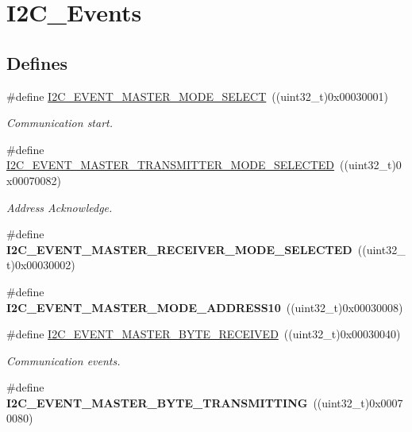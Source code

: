 \hypertarget{group__I2C__Events}{
\section{I2C\_\-Events}
\label{group__I2C__Events}
}
\subsection*{Defines}
\begin{DoxyCompactItemize}
\item 
\#define \hyperlink{group__I2C__Events_gaeef8c22ac035122b06e31b360ac7aeb3}{I2C\_\-EVENT\_\-MASTER\_\-MODE\_\-SELECT}~((uint32\_\-t)0x00030001)
\begin{DoxyCompactList}\small\item\em Communication start. \item\end{DoxyCompactList}\item 
\#define \hyperlink{group__I2C__Events_ga2361a6e60b7dc86fb682dd06fbd3edb7}{I2C\_\-EVENT\_\-MASTER\_\-TRANSMITTER\_\-MODE\_\-SELECTED}~((uint32\_\-t)0x00070082)
\begin{DoxyCompactList}\small\item\em Address Acknowledge. \item\end{DoxyCompactList}\item 
\hypertarget{group__I2C__Events_gabfde82864432ddb87b6462234d542e60}{
\#define {\bfseries I2C\_\-EVENT\_\-MASTER\_\-RECEIVER\_\-MODE\_\-SELECTED}~((uint32\_\-t)0x00030002)}
\label{group__I2C__Events_gabfde82864432ddb87b6462234d542e60}

\item 
\hypertarget{group__I2C__Events_gad04882597bbf542c6fee7a9c837fbc8c}{
\#define {\bfseries I2C\_\-EVENT\_\-MASTER\_\-MODE\_\-ADDRESS10}~((uint32\_\-t)0x00030008)}
\label{group__I2C__Events_gad04882597bbf542c6fee7a9c837fbc8c}

\item 
\#define \hyperlink{group__I2C__Events_ga6bcf2ae49961e07e27cf9fdf334719e3}{I2C\_\-EVENT\_\-MASTER\_\-BYTE\_\-RECEIVED}~((uint32\_\-t)0x00030040)
\begin{DoxyCompactList}\small\item\em Communication events. \item\end{DoxyCompactList}\item 
\hypertarget{group__I2C__Events_ga037ac1e67e44ee085acac6f034bd73b2}{
\#define {\bfseries I2C\_\-EVENT\_\-MASTER\_\-BYTE\_\-TRANSMITTING}~((uint32\_\-t)0x00070080)}
\label{group__I2C__Events_ga037ac1e67e44ee085acac6f034bd73b2}


\end{DoxyCompactItemize}
